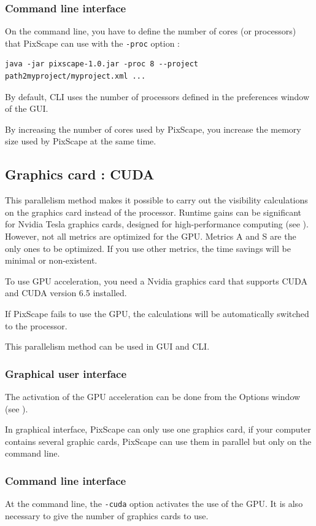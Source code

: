 \documentclass{report}
\begin{document}
\subsubsection{Command line interface}
On the command line, you have to define the number of cores (or processors) that PixScape can use with the \verb|-proc| option :
\begin{Verbatim}
java -jar pixscape-1.0.jar -proc 8 --project path2myproject/myproject.xml ...
\end{Verbatim}
By default, CLI uses the number of processors defined in the preferences window of the GUI.

By increasing the number of cores used by PixScape, you increase the memory size used by PixScape at the same time.


\subsection{Graphics card : CUDA}
\label{cuda}
This parallelism method makes it possible to carry out the visibility calculations on the graphics card instead of the processor. Runtime gains can be significant for Nvidia Tesla graphics cards, designed for high-performance computing (see ). However, not all metrics are optimized for the GPU. Metrics A and S are the only ones to be optimized. If you use other metrics, the time savings will be minimal or non-existent.

To use GPU acceleration, you need a Nvidia graphics card that supports CUDA and CUDA version 6.5 installed. 

If PixScape fails to use the GPU, the calculations will be automatically switched to the processor.

This parallelism method can be used in GUI and CLI.

\subsubsection{Graphical user interface}

The activation of the GPU acceleration can be done from the Options window (see ).

In graphical interface, PixScape can only use one graphics card, if your computer contains several graphic cards, PixScape can use them in parallel but only on the command line.

\subsubsection{Command line interface}
At the command line, the \verb|-cuda| option activates the use of the GPU. It is also necessary to give the number of graphics cards to use.
\end{document}
